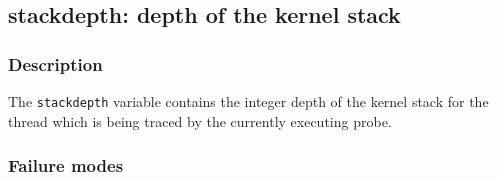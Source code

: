 \clearpage
{}
{}
\label{vars:stackdepth}
\subsection*{stackdepth: depth of the kernel stack}

\subsubsection*{Description}

The \verb|stackdepth| variable contains the integer depth of the
kernel stack for the thread which is being traced by the currently
executing probe.

\subsubsection*{Failure modes}

